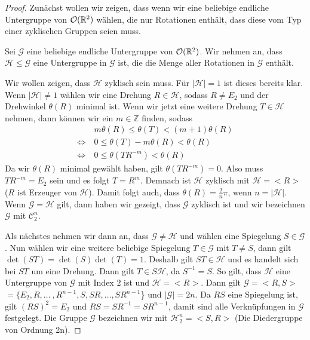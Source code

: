 \begin{proof}
	 Zunächst wollen wir zeigen, dass wenn wir eine beliebige endliche Untergruppe von ${\mathcal{O}(\mathbb{R}^2)}$ wählen, die nur Rotationen enthält, dass diese vom Typ einer zyklischen Gruppen seien muss. \par\smallskip  
	 Sei $\mathcal{G}$ eine beliebige endliche Untergruppe von ${\mathcal{O}(\mathbb{R}^2)}$. Wir nehmen an, dass $\mathcal{H} \leq \mathcal{G}$ eine Untergruppe in $\mathcal{G}$ ist, die die Menge aller Rotationen in $\mathcal{G}$ enthält. 
	 
	 Wir wollen zeigen, dass $\mathcal{H}$ zyklisch sein muss. Für $|\mathcal{H}|=1$ ist dieses bereits klar. Wenn $|\mathcal{H}| \neq 1$ wählen wir eine Drehung $R \in \mathcal{H}$, sodass $R \neq E_2$ und der Drehwinkel $\theta(R)$ minimal ist. Wenn wir jetzt eine weitere Drehung $T \in \mathcal{H}$ nehmen, dann können wir ein $m \in \mathbb{Z}$ finden, sodass \begin{align*}
	 &m \theta(R)\leq\theta(T)<(m+1)\theta(R) \\
	 \Leftrightarrow \ &0 \leq \theta(T)-m\theta(R)<\theta(R) \\
	 \Leftrightarrow \ &0 \leq \theta(TR^{-m})<\theta(R)                                                                                                                                                                                                                                                                                                                                                           
	 \end{align*}
	 Da wir $\theta(R)$ minimal gewählt haben, gilt $\theta(TR^{-m})=0$. Also muss $TR^{-m}=E_2$ sein und es folgt $T=R^{m}$. Demnach ist $\mathcal{H}$ zyklisch mit $\mathcal{H}=<R>$ ($R$ ist Erzeuger von $\mathcal{H}$). Damit folgt auch, dass $\theta(R)=\frac{2}{n}\pi$, wenn $n=|\mathcal{H}|$. Wenn $\mathcal{G} = \mathcal{H}$ gilt, dann haben wir gezeigt, dass $\mathcal{G}$ zyklisch ist und wir bezeichnen $\mathcal{G}$ mit $\mathcal{C}^n_2$.
	 
	 Als nächstes nehmen wir dann an, dass $\mathcal{G} \neq \mathcal{H}$ und wählen eine Spiegelung $S \in \mathcal{G}$. Nun wählen wir eine weitere beliebige Spiegelung $T \in \mathcal{G}$ mit $T \neq S$, dann gilt $\det(ST)=\det(S)\det(T)=1$. Deshalb gilt $ST \in \mathcal{H}$ und es handelt sich bei $ST$ um eine Drehung. Dann gilt $T \in S\mathcal{H}$, da $S^{-1}=S$. So gilt, dass $\mathcal{H}$ eine Untergruppe von $\mathcal{G}$ mit Index $2$ ist und $\mathcal{H}=<R>$. Dann gilt $\mathcal{G}=<R,S>$ $=\{E_2,R,\dots \ ,R^{n-1},S,SR,\dots ,SR^{n-1}$\} und $|\mathcal{G}|=2n$. Da $RS$ eine Spiegelung ist, gilt $(RS)^2=E_2$ und $RS=SR^{-1}=SR^{n-1}$, damit sind alle Verknüpfungen in $\mathcal{G}$ festgelegt. Die Gruppe $\mathcal{G}$ bezeichnen wir mit $\mathcal{H}^n_2=<S,R>$ (Die Diedergruppe von Ordnung 2n).
\end{proof}